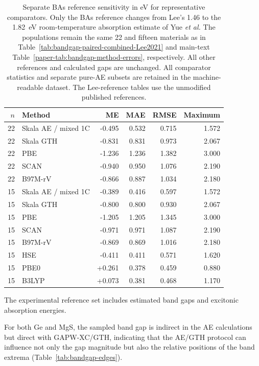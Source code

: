 \documentclass[10pt,a4paper]{article}
\begin{document}
\begin{table}[htbp]
\centering
\caption{Separate BAs reference sensitivity in eV for representative comparators. Only the BAs reference changes from Lee's 1.46 to the 1.82~eV room-temperature absorption estimate of Yue \emph{et al.}\cite{Yue2020BAs} The populations remain the same 22 and fifteen materials as in Table~\ref{tab:bandgap-paired-combined-Lee2021} and main-text Table~\ref{paper-tab:bandgap-method-errors}, respectively. All other references and calculated gaps are unchanged. All comparator statistics and separate pure-AE subsets are retained in the machine-readable dataset. The Lee-reference tables use the unmodified published references.}\label{tab:bandgap-BAs-sensitivity}
\begin{tabular}{rlrrrr}
\toprule
$n$ & Method & ME & MAE & RMSE & Maximum \\
\midrule
22 & Skala AE / mixed 1C & -0.495 & 0.532 & 0.715 & 1.572 \\
22 & Skala GTH & -0.831 & 0.831 & 0.973 & 2.067 \\
22 & PBE & -1.236 & 1.236 & 1.382 & 3.000 \\
22 & SCAN & -0.940 & 0.950 & 1.076 & 2.190 \\
22 & B97M-rV & -0.866 & 0.887 & 1.034 & 2.180 \\
15 & Skala AE / mixed 1C & -0.389 & 0.416 & 0.597 & 1.572 \\
15 & Skala GTH & -0.800 & 0.800 & 0.930 & 2.067 \\
15 & PBE & -1.205 & 1.205 & 1.345 & 3.000 \\
15 & SCAN & -0.971 & 0.971 & 1.087 & 2.190 \\
15 & B97M-rV & -0.869 & 0.869 & 1.016 & 2.180 \\
15 & HSE & -0.411 & 0.411 & 0.571 & 1.620 \\
15 & PBE0 & +0.261 & 0.378 & 0.459 & 0.880 \\
15 & B3LYP & +0.073 & 0.381 & 0.468 & 1.170 \\
\bottomrule
\end{tabular}
\end{table}
\FloatBarrier


The experimental reference set includes estimated band gaps and excitonic absorption energies.\cite{Wolverson2001MgS,Zollweg1958Absorption}

For both Ge and MgS, the sampled band gap is indirect in the AE calculations but direct with GAPW-XC/GTH, indicating that the AE/GTH protocol can influence not only the gap magnitude but also the relative positions of the band extrema (Table~\ref{tab:bandgap-edges}).
\end{document}
